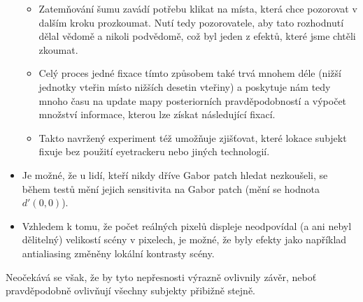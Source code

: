 \begin{itemize}
\begin{itemize}
\item Zatemňování šumu zavádí potřebu klikat na místa, která chce pozorovat v
dalším kroku prozkoumat. Nutí tedy pozorovatele, aby tato rozhodnutí dělal
vědomě a nikoli podvědomě, což byl jeden z efektů, které jsme chtěli zkoumat.

\item Celý proces jedné fixace tímto způsobem také trvá mnohem déle (nižší
jednotky vteřin místo nižších desetin vteřiny) a poskytuje nám tedy mnoho času
na update mapy posteriorních pravděpodobností a výpočet množství informace,
kterou lze získat následující fixací.

\item Takto navržený experiment též umožňuje zjišťovat, které lokace subjekt
fixuje bez použití eyetrackeru nebo jiných technologií.

\end{itemize}

\item Je možné, že u lidí, kteří nikdy dříve Gabor patch hledat nezkoušeli, se
během testů mění jejich sensitivita na Gabor patch (mění se hodnota $d'(0,0)$).

\item Vzhledem k tomu, že počet reálných pixelů displeje neodpovídal (a ani
nebyl dělitelný) velikostí scény v pixelech, je možné, že byly efekty jako
například antialiasing změněny lokální kontrasty scény.

\end{itemize}

Neočekává se však, že by tyto nepřesnosti výrazně ovlivnily závěr, neboť
pravděpodobně ovlivňují všechny subjekty přibižně stejně.

